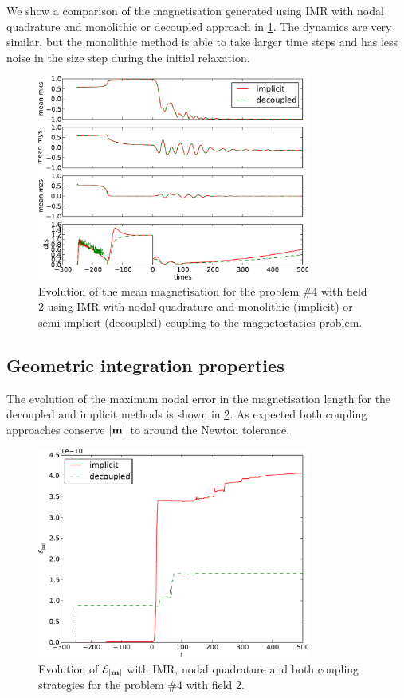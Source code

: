 We show a comparison of the magnetisation generated using IMR with nodal quadrature and monolithic or decoupled approach in \cref{fig:mumag4-implicit-decoupled}.
The dynamics are very similar, but the monolithic method is able to take larger time steps and has less noise in the size step during the initial relaxation.
\begin{figure}
  \centering
  \includegraphics[width=0.8\textwidth]
  {plots/monolithic_vs_decoupled/meanmxsvs-meanmysvs-meanmzsvs-dtsvstimes.pdf}
  \caption{
    Evolution of the mean magnetisation for the \mumag problem \#4 with field 2 using IMR with nodal quadrature and monolithic (implicit) or semi-implicit (decoupled) coupling to the magnetostatics problem.
  }
  \label{fig:mumag4-implicit-decoupled}
\end{figure}

\subsection{Geometric integration properties}

The evolution of the maximum nodal error in the magnetisation length for the decoupled and implicit methods is shown in \cref{fig:imr-conservation}.
As expected both coupling approaches conserve $\left|{\boldsymbol{\mathrm{m}}} \right|$ to around the Newton tolerance.
\begin{figure}
  \centering
  \includegraphics[width=0.8\textwidth]{plots/mumag4_ml/mlengtherrormaxesvstimes.pdf}
  \caption{
    Evolution of $\mathcal{E}_{\left|{\boldsymbol{\mathrm{m}}} \right|}$
    with IMR, nodal quadrature and both coupling strategies
    for the \mumag problem \#4 with field 2.
  }
  \label{fig:imr-conservation}
\end{figure}


